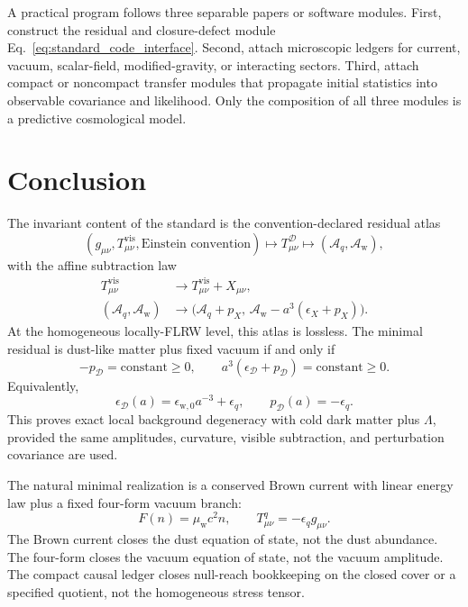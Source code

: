 \documentclass[
  aps,
  prd,
  reprint,
  superscriptaddress,
  floatfix,
  nofootinbib,
  longbibliography
]{revtex4-2}
\theoremstyle{plain}
\theoremstyle{definition}
\theoremstyle{remark}
\newcommand{\D}{\mathcal D}
\newcommand{\vis}{\mathrm{vis}}
\newcommand{\wind}{\mathrm w}
\newcommand{\Aq}{\mathcal A_q}
\newcommand{\Aw}{\mathcal A_{\mathrm w}}
\newcommand{\eps}{\epsilon}
\begin{document}
A practical program follows three separable papers or software modules.  First,
construct the residual and closure-defect module Eq.~\eqref{eq:standard_code_interface}.  Second,
attach microscopic ledgers for current, vacuum, scalar-field, modified-gravity,
or interacting sectors.  Third, attach compact or noncompact transfer modules
that propagate initial statistics into observable covariance and likelihood.
Only the composition of all three modules is a predictive cosmological model.


\section{Conclusion}

The invariant content of the standard is the convention-declared residual
atlas
\begin{equation}
(g_{\mu\nu},T^{\vis}_{\mu\nu},\text{Einstein convention})
\longmapsto
T^\D_{\mu\nu}
\longmapsto
(\Aq,\Aw),
\end{equation}
with the affine subtraction law
\begin{align}
T^{\vis}_{\mu\nu}&\to T^{\vis}_{\mu\nu}+X_{\mu\nu},\\
(\Aq,\Aw)&\to
\bigl(\Aq+p_X,\,\Aw-a^3(\eps_X+p_X)\bigr).
\end{align}
At the homogeneous locally-FLRW level, this atlas is lossless.  The minimal
residual is dust-like matter plus fixed vacuum if and only if
\begin{equation}
-p_\D=\text{constant}\ge0,
\qquad
a^3(\eps_\D+p_\D)=\text{constant}\ge0 .
\end{equation}
Equivalently,
\begin{equation}
\eps_\D(a)=\eps_{\wind,0}a^{-3}+\eps_q,
\qquad
p_\D(a)=-\eps_q .
\end{equation}
This proves exact local background degeneracy with cold dark matter plus
\(\Lambda\), provided the same amplitudes, curvature, visible subtraction, and
perturbation covariance are used.

The natural minimal realization is a conserved Brown current with linear energy
law plus a fixed four-form vacuum branch:
\begin{equation}
F(n)=\mu_{\wind}c^2 n,
\qquad
T^q_{\mu\nu}=-\eps_q g_{\mu\nu}.
\end{equation}
The Brown current closes the dust equation of state, not the dust abundance.  The
four-form closes the vacuum equation of state, not the vacuum amplitude.  The
compact causal ledger closes null-reach bookkeeping on the closed cover or a
specified quotient, not the homogeneous stress tensor.
\end{document}
